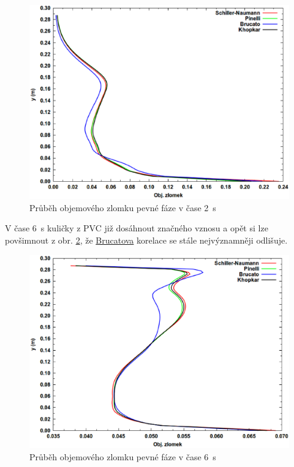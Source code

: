 \begin{figure}[h!]
\begin{center}
\includegraphics[scale=0.47]{images/Vol-2.eps}
\caption{Průběh objemového zlomku pevné fáze v čase \SI{2}{\second}}
\label{fig:vol2}
\end{center}
\end{figure} 

\vspace{-9mm}

\noindent V čase \SI{6}{\second} kuličky z PVC již dosáhnout značného vznosu a opět si lze povšimnout z obr. \ref{fig:vol6}, že \hyperlink{hyp:cds}{Brucatova} korelace se stále nejvýznamněji odlišuje.  

\begin{figure}[h!]
\begin{center}
\includegraphics[scale=0.47]{images/Vol-6.eps}
\caption{Průběh objemového zlomku pevné fáze v čase \SI{6}{\second}}
\label{fig:vol6}
\end{center}
\end{figure} 

